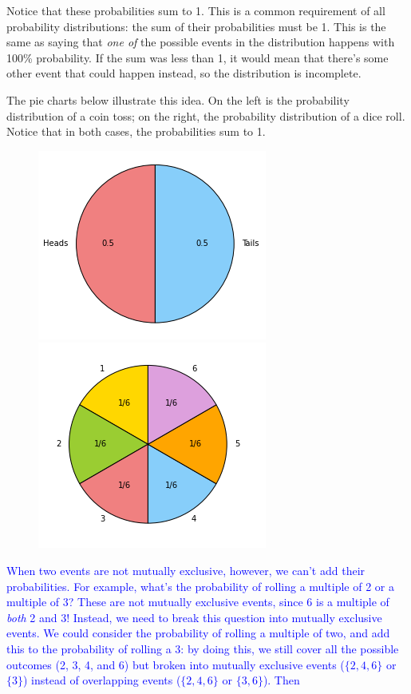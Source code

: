 \documentclass[12 pt]{article}
\newcommand{\new}[1]{\textcolor{blue}{#1}}
\newcounter{example}[section]
\begin{document}
Notice that these probabilities sum to 1. 
This is a common requirement of all probability distributions: the sum of their 
probabilities must be 1. This is the same as saying that \emph{one of} the possible events 
in the distribution happens with 100\% probability. If the sum was less than 1, it 
would mean that there's some other event that could happen instead, so the distribution
is incomplete. %

The pie charts below illustrate this idea. On the left is the probability 
distribution of a coin toss; on the right, the probability distribution 
of a dice roll. Notice that in both cases, the probabilities sum to 1.

\begin{figure}[h]
    \includegraphics[width=.5\linewidth]{imgs/coin-pie.png}
    \includegraphics[width=.5\linewidth]{imgs/die-pie.png}
    \label{fig:pies}
  \end{figure}

\new{When two events are not mutually exclusive, however, we can't add 
their probabilities. For example, what's the probability of rolling a 
multiple of 2 or a multiple of 3? These are not mutually exclusive
events, since 6 is a multiple of \emph{both} 2 and 3! Instead, we need 
to break this question into mutually exclusive events. We could consider 
the probability of rolling a multiple of two, and add this to the 
probability of rolling a 3: by doing this, we still cover all the 
possible outcomes (2, 3, 4, and 6) but broken into mutually exclusive 
events ($\{2,4,6\}$ or $\{3\}$) instead of overlapping events ($\{2, 4, 
6\}$ or $\{3, 6\}$). Then}
\end{document}
